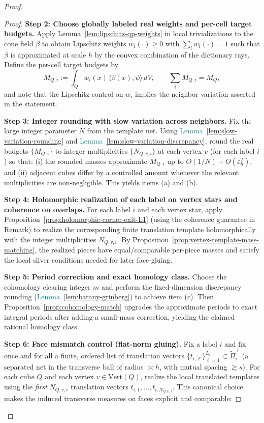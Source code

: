 \documentclass[11pt]{article}
\newcommand{\REVMZ}[1]{\textcolor{teal}{#1}}  %
\numberwithin{equation}{section}  %
\theoremstyle{plain}
\theoremstyle{definition}
\theoremstyle{remark}
\begin{document}
\begin{proof}
\begin{proof}
{\smallskip\noindent
\textbf{Step 2: Choose globally labeled real weights and per-cell target budgets.}
Apply Lemma~\ref{lem:lipschitz-qp-weights} in local trivializations to the cone field $\beta$ to obtain
Lipschitz weights $w_i(\cdot)\ge 0$ with $\sum_i w_i(\cdot)=1$ such that
$\beta$ is approximated at scale $h$ by the convex combination of the dictionary rays.
Define the per-cell target budgets by
\[
M_{Q,i}:=\int_Q w_i(x)\,\langle\beta(x),\psi\rangle\,dV,
\qquad \sum_i M_{Q,i}=M_Q,
\]
and note that the Lipschitz control on $w_i$ implies the neighbor variation asserted in the statement.

\smallskip\noindent
\textbf{Step 3: Integer rounding with slow variation across neighbors.}
Fix the large integer parameter $N$ from the template net.
Using \REVMZ{Lemma~\ref{lem:slow-variation-rounding}} and \REVMZ{Lemma~\ref{lem:slow-variation-discrepancy}}, round the real budgets
$\{M_{Q,i}\}$ to integer multiplicities $\{N_{Q,v,i}\}$ at each vertex $v$ (for each label $i$) so that:
(i) the rounded masses approximate $M_{Q,i}$ up to $O(1/N)+O(\varepsilon_h^2)$,
and (ii) adjacent cubes differ by a controlled amount whenever the relevant multiplicities are non-negligible.
This yields items \textnormal{(a)} and \textnormal{(b)}.

\smallskip\noindent
\textbf{Step 4: Holomorphic realization of each label on vertex stars and coherence on overlaps.}
For each label $i$ and each vertex star, apply Proposition~\ref{prop:holomorphic-corner-exit-L1}
(using the coherence guarantee in Remark) to realize the corresponding finite
translation template holomorphically with the integer multiplicities $N_{Q,v,i}$.
By Proposition~\ref{prop:vertex-template-mass-matching}, the realized pieces have equal/comparable per-piece masses
and satisfy the local sliver conditions needed for later face-gluing.

\smallskip\noindent
\textbf{Step 5: Period correction and exact homology class.}
Choose the cohomology clearing integer $m$ and perform the fixed-dimension discrepancy rounding
(\REVMZ{Lemma~\ref{lem:barany-grinberg}}) to achieve item \textnormal{(c)}.
Then Proposition~\ref{prop:cohomology-match} upgrades the approximate periods to exact integral periods after adding a
small-mass correction, yielding the claimed rational homology class.

\smallskip\noindent
\textbf{Step 6: Face mismatch control (flat-norm gluing).}
Fix a label $i$ and fix once and for all a finite, ordered list of translation vectors
$\{t_{i,\ell}\}_{\ell=1}^{L_i}\subset \widetilde\Pi_i^\perp$ (a separated net in the transverse ball of radius $\asymp h$,
with mutual spacing $\gtrsim s$).
For each cube $Q$ and each vertex $v\in \mathrm{Vert}(Q)$, realize the local translated templates using the \emph{first}
$N_{Q,v,i}$ translation vectors $t_{i,1},\dots,t_{i,N_{Q,v,i}}$.
This canonical choice makes the induced transverse measures on faces explicit and comparable:

}
\end{proof}
\end{proof}
\end{document}
